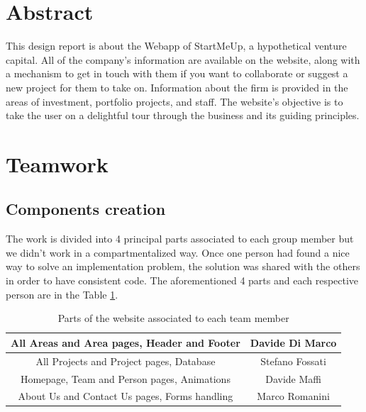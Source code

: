 \documentclass[11pt, letterpaper]{article}
\begin{document}
\cleardoublepage

\fancyhead{}
\fancyfoot{}
\fancyhead[C]{}
\cfoot{\thepage}

\tableofcontents
\cleardoublepage
            
\section{Abstract}
This design report is about the Webapp of StartMeUp, a hypothetical venture capital. All of the company's information are available on the website, along with a mechanism to get in touch with them if you want to collaborate or suggest a new project for them to take on.
Information about the firm is provided in the areas of investment, portfolio projects, and staff.
The website's objective is to take the user on a delightful tour through the business and its guiding principles.\\

\section{Teamwork}
\subsection{Components creation}
The work is divided into 4 principal parts associated to each group member but we didn't work in a compartmentalized way.
Once one person had found a nice way to solve an implementation problem, the solution was shared with the others in order to have consistent code.
The aforementioned 4 parts and each respective person are in the Table \ref{tab:parts}.
\vspace{3mm}

\begin{table}[h!]
    \centering
    \begin{tabular}{|c|c|}
        \hline
        All Areas and Area pages, Header and Footer & Davide Di Marco \\
        \hline
        All Projects and Project pages, Database & Stefano Fossati \\
        \hline
        Homepage, Team and Person pages, Animations & Davide Maffi \\
        \hline
        About Us and Contact Us pages, Forms handling & Marco Romanini \\
        \hline
    \end{tabular}
    \caption{Parts of the website associated to each team member}
    \label{tab:parts}
\end{table}
\end{document}
